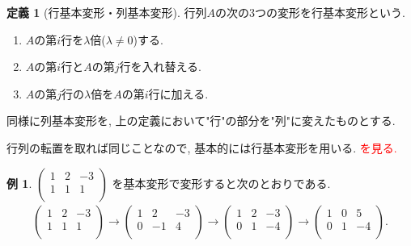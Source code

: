 \documentclass[dvipdfmx,a4paper,11pt]{article} %
\newcommand{\maru}[1]{\raise0.2ex\hbox{\textcircled{\tiny{#1}}}}
\newcommand{\xr}[1]{\textcolor{red}{#1}}
\theoremstyle{definition}
\newtheorem{dfn}[thm]{定義}
\newtheorem{exa}[thm]{例}
\begin{document}
    \begin{dfn}[{\cite[定義 2.2.1]{O}行基本変形・列基本変形}]
    \label{dfn-basic-trans}
 行列$A$の次の3つの変形を行基本変形という.
 \begin{enumerate}
   \setlength{\parskip}{0cm} 
  \setlength{\itemsep}{0cm}
  \item[(I)] $A$の第$i$行を$\lambda$倍($\lambda\neq 0$)する.
 \item[(II)] $A$の第$i$行と$A$の第$j$行を入れ替える.
 \item[(III)] $A$の第$j$行の$\lambda$倍を$A$の第$i$行に加える. 
 \end{enumerate}
   同様に列基本変形を, 上の定義において"行"の部分を"列"に変えたものとする. 
  \end{dfn}
行列の転置を取れば同じことなので, 基本的には行基本変形を用いる. 
\xr{\cite[例 2.2.2]{O}を見る.}
\begin{exa}
$
 \begin{pmatrix}
 1& 2& -3  \\
 1& 1& 1  \\
 \end{pmatrix}
 $
 を基本変形で変形すると次のとおりである.
 \begin{align*}
  \begin{pmatrix}
 1& 2& -3  \\
 1& 1& 1  \\
 \end{pmatrix}
 \longrightarrow %
   \begin{pmatrix}
 1& 2& -3  \\
 0& -1& 4  \\
 \end{pmatrix}
 \longrightarrow %
   \begin{pmatrix}
 1& 2& -3  \\
 0& 1& -4  \\
 \end{pmatrix}
 \longrightarrow %
   \begin{pmatrix}
 1& 0& 5  \\
 0& 1& -4  \\
 \end{pmatrix}.
  \end{align*}

\end{exa}
\end{document}
